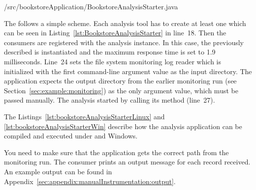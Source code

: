 \setJavaCodeListing       
%
{\manualInstrumentedBookstoreApplicationDir/src/bookstoreApplication/BookstoreAnalysisStarter.java}

\noindent The  follows a simple scheme. Each %
analysis tool has to create at least one  which can be %
seen in Listing~\ref{lst:BookstoreAnalysisStarter} in line~18. Then the consumers %
are registered with the analysis instance. In this case, the previously described %
 is instantiated and the maximum response time is set to 1.9 milliseconds. %
Line~24 sets the file system monitoring log reader which is initialized with the first %
command-line argument value as the input directory. The application expects the %
output directory from the earlier monitoring run (see Section~\ref{sec:example:monitoring}) %
as the only argument value, which must be passed manually. %
The analysis started by calling its  method (line~27). %

\pagebreak

The Listings~\ref{lst:bookstoreAnalysisStarterLinux} and \ref{lst:bookstoreAnalysisStarterWin} %
describe how the analysis application can be compiled and executed under \UnixLikeSystems{} and Windows.

\setBashListing 		

	
	

\noindent You need to make sure that the application gets the correct path from the monitoring run. 
The consumer prints an output message for each record received. %
An example output can be found in Appendix~\ref{sec:appendix:manualInstrumentation:output}.
